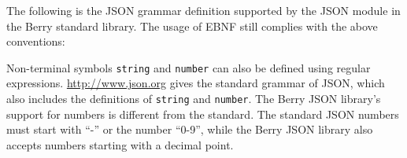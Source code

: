 The following is the JSON grammar definition supported by the JSON module in the Berry standard library. The usage of EBNF still complies with the above conventions:



Non-terminal symbols \texttt{string} and \texttt{number} can also be defined using regular expressions. \url{http://www.json.org} gives the standard grammar of JSON, which also includes the definitions of \texttt{string} and \texttt{number}. The Berry JSON library's support for numbers is different from the standard. The standard JSON numbers must start with ``-'' or the number ``0-9'', while the Berry JSON library also accepts numbers starting with a decimal point.